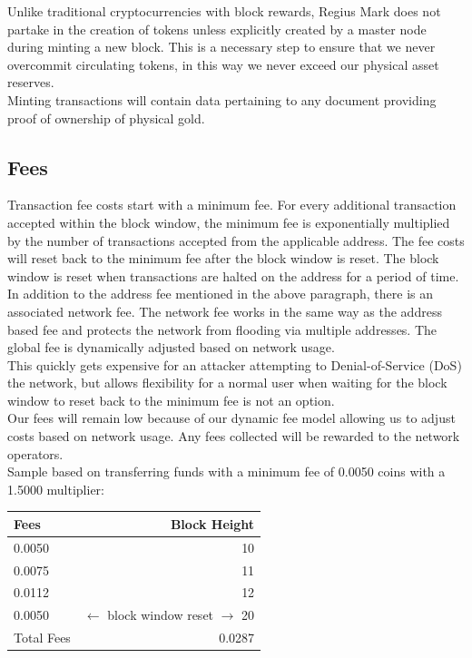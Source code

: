 \documentclass[12pt,a4paper]{article}
\begin{document}
  Unlike traditional cryptocurrencies with block rewards, Regius Mark does not
  partake in the creation of tokens unless explicitly created by a master node
  during minting a new block. This is a necessary step to ensure that we never
  overcommit circulating tokens, in this way we never exceed our physical asset
  reserves.\\

  Minting transactions will contain data pertaining to any document providing
  proof of ownership of physical gold.

  \subsection{Fees}
  Transaction fee costs start with a minimum fee. For every additional
  transaction accepted within the block window, the minimum fee is exponentially
  multiplied by the number of transactions accepted from the applicable address.
  The fee costs will reset back to the minimum fee after the block window is
  reset. The block window is reset when transactions are halted on the address
  for a period of time.\\

  In addition to the address fee mentioned in the above paragraph, there is an
  associated  network fee. The network fee works in the same way as
  the address based fee and protects the network from flooding via multiple
  addresses. The global fee is dynamically adjusted based on network usage.\\

  This quickly gets expensive for an attacker attempting to Denial-of-Service
  (DoS) the network, but allows flexibility for a normal user when waiting for
  the block window to reset back to the minimum fee is not an option.\\

  Our fees will remain low because of our dynamic fee model allowing us to
  adjust costs based on network usage. Any fees collected will be rewarded to
  the network operators.\\

  \newpage
  Sample based on transferring funds with a minimum fee of 0.0050 coins with a
  1.5000 multiplier:

  \vspace{3mm}
  \begin{tabular}{@{}lr@{}}
    Fees & Block Height     \\ \toprule
    0.0050 & 10             \\
    0.0075 & 11             \\
    0.0112 & 12             \\
    0.0050 & $\leftarrow{}$ block window reset $\rightarrow{}$ 20 \\ \midrule{}
    Total Fees & 0.0287     \\
    \bottomrule
  \end{tabular}
\end{document}
